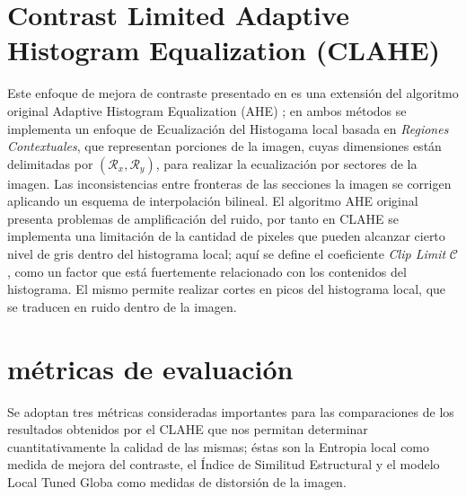 \documentclass[spanish,twocolumn]{article}
\begin{document}



\section{Contrast Limited Adaptive Histogram Equalization (CLAHE)}
\label{sec:clahe}
Este enfoque de mejora de contraste presentado en \cite{Zuiderveld:1994:CLA:180895.180940} es una extensión del algoritmo original Adaptive Histogram Equalization (AHE) \cite{pizer1987adaptive}; en ambos métodos se implementa un enfoque de Ecualización del Histogama local basada en {\it Regiones Contextuales}, que representan porciones de la imagen, cuyas dimensiones están delimitadas por $(\mathcal{R}_x, \mathcal{R}_y)$, para realizar la ecualización por sectores de la imagen. Las inconsistencias entre fronteras de las secciones la imagen se corrigen aplicando un esquema de interpolación bilineal. 
El algoritmo AHE original presenta problemas de amplificación del ruido, por tanto en CLAHE se implementa una limitación de la cantidad de pixeles que pueden alcanzar cierto nivel de gris dentro del histograma local; aquí se define el coeficiente {\it Clip Limit} $\mathcal{C}$, como un factor que está fuertemente relacionado con los contenidos del histograma. El mismo permite realizar cortes en picos del histograma local, que se traducen en ruido dentro de la imagen.


\section{métricas de evaluación}
\label{sec:metricas}
Se adoptan tres métricas consideradas importantes para las comparaciones de los resultados obtenidos por el CLAHE que nos permitan determinar cuantitativamente la calidad de las mismas; éstas son la Entropia local como medida de mejora del contraste, el Índice de Similitud Estructural y el modelo Local Tuned Globa como medidas de distorsión de la imagen.
\end{document}
